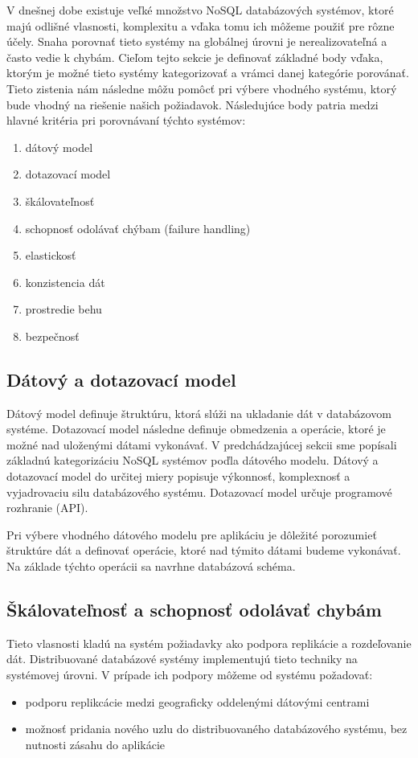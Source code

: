 \documentclass[11pt,twoside,a4paper]{book}
\begin{document}
V dnešnej dobe existuje veľké množstvo NoSQL databázových systémov, ktoré majú odlišné vlasnosti, komplexitu a vďaka tomu ich môžeme použiť pre rôzne účely. Snaha porovnať tieto systémy na globálnej úrovni je nerealizovateľná a často vedie k chybám. Cieľom tejto sekcie je definovať základné body vďaka, ktorým je možné tieto systémy kategorizovať a vrámci danej kategórie porovánať. Tieto zistenia nám následne môžu pomôcť pri výbere vhodného systému, ktorý bude vhodný na riešenie našich požiadavok. Následujúce body patria medzi hlavné kritéria pri porovnávaní týchto systémov:
\begin{enumerate}
 \item
  dátový model
 \item 
  dotazovací model
 \item
  škálovateľnosť
 \item 
  schopnosť odolávať chýbam (failure handling)
 \item
  elastickosť
 \item 
  konzistencia dát
 \item
  prostredie behu
 \item 
  bezpečnosť 
\end{enumerate}

\subsection{Dátový a dotazovací model}
Dátový model definuje štruktúru, ktorá slúži na ukladanie dát v databázovom systéme. Dotazovací model následne definuje obmedzenia a operácie, ktoré je možné nad uloženými dátami vykonávať. V predchádzajúcej sekcii sme popísali základnú kategorizáciu NoSQL systémov poďla dátového modelu. Dátový a dotazovací model do určitej miery popisuje výkonnosť, komplexnosť a vyjadrovaciu silu databázového systému. Dotazovací model určuje programové rozhranie (API).

Pri výbere vhodného dátového modelu pre aplikáciu je dôležité porozumieť štruktúre dát a definovať operácie, ktoré nad týmito dátami budeme vykonávať. Na základe týchto operácii sa navrhne databázová schéma.


\subsection{Škálovateľnosť a schopnosť odolávať chybám}
Tieto vlasnosti kladú na systém požiadavky ako podpora replikácie a rozdeľovanie dát. Distribuované databázové systémy implementujú tieto techniky na systémovej úrovni. V prípade ich podpory môžeme od systému požadovať:
\begin{itemize}
  \item
  podporu replikcácie medzi geograficky oddelenými dátovými centrami
  \item
  možnosť pridania nového uzlu do distribuovaného databázového systému, bez nutnosti zásahu do aplikácie
\end{itemize}
\end{document}
